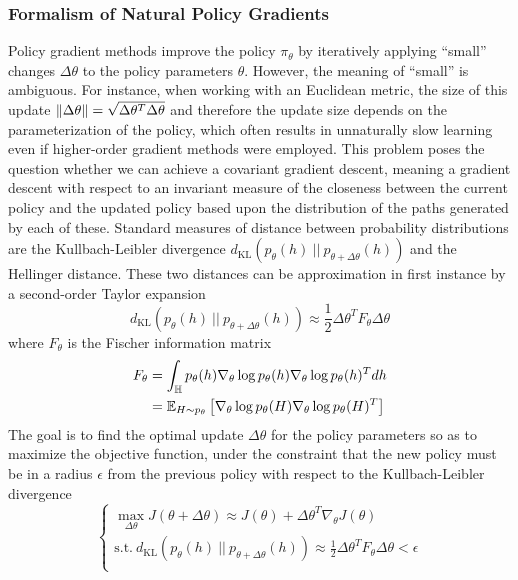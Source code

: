 \subsubsection{Formalism of Natural Policy Gradients}
Policy gradient methods improve the policy $\pi_\theta$ by iteratively applying ``small'' changes $\Delta \theta$ to the policy parameters $\theta$. However, the meaning of ``small'' is ambiguous. For instance, when working with an Euclidean metric, the size of this update $\norm{\Delta \theta} = \sqrt{\Delta\theta^T \Delta\theta}$ and therefore the update size depends on the parameterization of the policy, which often results in unnaturally slow learning even if higher-order gradient methods were employed. This problem poses the question whether we can achieve a covariant gradient descent, meaning a gradient descent with respect to an invariant measure of the closeness between the current policy and the updated policy based upon the distribution of the paths generated by each of these. Standard measures of distance between probability distributions are the Kullbach-Leibler divergence $d_{\text{KL}}(p_\theta(h)\ ||\ p_{\theta + \Delta \theta}(h))$ and the Hellinger distance. These two distances can be approximation in first instance by a second-order Taylor expansion
\begin{equation*}
	d_{\text{KL}}(p_\theta(h)\ ||\ p_{\theta + \Delta \theta}(h)) \approx \frac{1}{2} \Delta\theta^T F_\theta \Delta\theta
\end{equation*} 
where $F_\theta$ is the Fischer information matrix
\begin{equation}
	\begin{split}
	F_\theta &= \int_{\H} p_\theta(h) \nabla_\theta\log p_\theta(h) \nabla_\theta\log p_\theta(h)^T dh\\
		&= \E[H\sim p_\theta]{\nabla_\theta\log p_\theta(H) \nabla_\theta\log p_\theta(H)^T}
	\end{split}
\end{equation}
The goal is to find the optimal update $\Delta \theta$ for the policy parameters so as to maximize the objective function, under the constraint that the new policy must be in a radius $\epsilon$ from the previous policy with respect to the Kullbach-Leibler divergence
\begin{equation*}
	\begin{cases}
		\max_{\Delta\theta} J(\theta + \Delta \theta) \approx J(\theta) + \Delta \theta^T \nabla_\theta J(\theta)\\
		\text{s.t.}\ d_{\text{KL}}(p_\theta(h)\ ||\ p_{\theta + \Delta \theta}(h)) \approx \frac{1}{2} \Delta\theta^T F_\theta \Delta\theta < \epsilon\\  	
	\end{cases}
\end{equation*}
